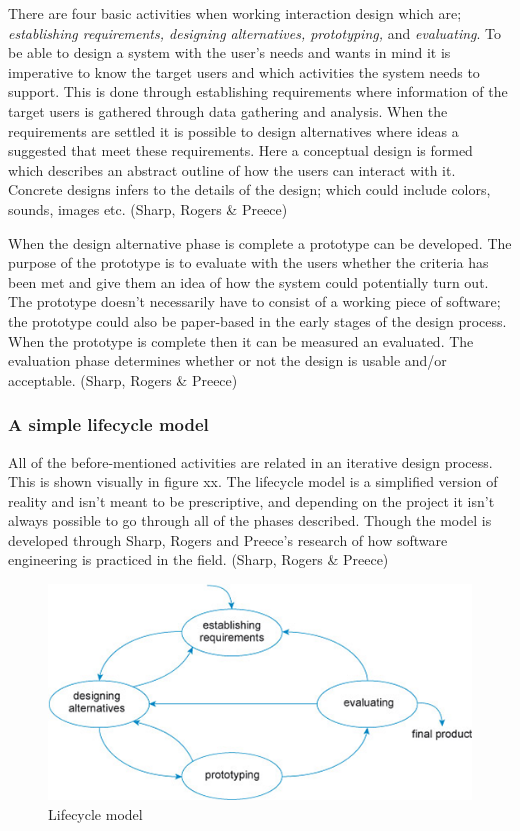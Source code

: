 There are four basic activities when working interaction design which are; \textit{establishing requirements, designing alternatives, prototyping,} and \textit{evaluating}. To be able to design a system with the user’s needs and wants in mind it is imperative to know the target users and which activities the system needs to support. This is done through establishing requirements where information of the target users is gathered through data gathering and analysis. When the requirements are settled it is possible to design alternatives where ideas a suggested that meet these requirements. Here a conceptual design is formed which describes an abstract outline of how the users can interact with it. Concrete designs infers to the details of the design; which could include colors, sounds, images etc. (Sharp, Rogers \& Preece)

When the design alternative phase is complete a prototype can be developed. The purpose of the prototype is to evaluate with the users whether the criteria has been met and give them an idea of how the system could potentially turn out. The prototype doesn’t necessarily have to consist of a working piece of software; the prototype could also be paper-based in the early stages of the design process. When the prototype is complete then it can be measured an evaluated. The evaluation phase determines whether or not the design is usable and/or acceptable. (Sharp, Rogers \& Preece)

\subsubsection{A simple lifecycle model}
All of the before-mentioned activities are related in an iterative design process. This is shown visually in figure xx. The lifecycle model is a simplified version of reality and isn’t meant to be prescriptive, and depending on the project it isn’t always possible to go through all of the phases described. Though the model is developed through Sharp, Rogers and Preece’s research of how software engineering is practiced in the field. (Sharp, Rogers \& Preece)

\begin{figure}[h]
	\includegraphics[width=1\textwidth]{billeder/lifecycle.png}
	\caption{Lifecycle model}
\end{figure}

